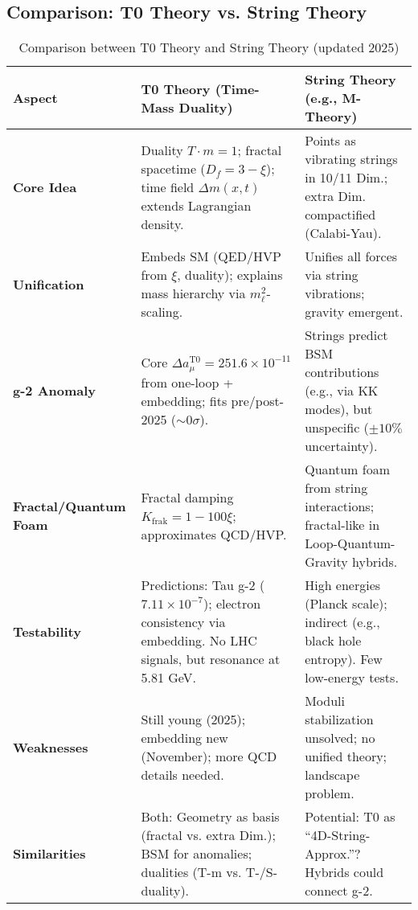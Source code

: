 \documentclass[12pt,a4paper]{article}
\begin{document}
	\subsection{Comparison: T0 Theory vs. String Theory}
	
	\begin{table}[ht]
		\centering
		\begin{tabular}{|p{4cm}|p{5cm}|p{5cm}|}
			\hline
			\textbf{Aspect} & \textbf{T0 Theory (Time-Mass Duality)} & \textbf{String Theory (e.g., M-Theory)} \\
			\hline
			\textbf{Core Idea} & Duality $T \cdot m = 1$; fractal spacetime ($D_f = 3 - \xi$); time field $\Delta m(x,t)$ extends Lagrangian density. & Points as vibrating strings in 10/11 Dim.; extra Dim. compactified (Calabi-Yau). \\
			\hline
			\textbf{Unification} & Embeds SM (QED/HVP from $\xi$, duality); explains mass hierarchy via $m_\ell^2$-scaling. & Unifies all forces via string vibrations; gravity emergent. \\
			\hline
			\textbf{g-2 Anomaly} & Core $\Delta a_\mu^{\text{T0}} = 251.6 \times 10^{-11}$ from one-loop + embedding; fits pre/post-2025 ($\sim 0 \sigma$). & Strings predict BSM contributions (e.g., via KK modes), but unspecific ($\pm 10\%$ uncertainty). \\
			\hline
			\textbf{Fractal/Quantum Foam} & Fractal damping $K_{\text{frak}} = 1 - 100\xi$; approximates QCD/HVP. & Quantum foam from string interactions; fractal-like in Loop-Quantum-Gravity hybrids. \\
			\hline
			\textbf{Testability} & Predictions: Tau g-2 ($7.11 \times 10^{-7}$); electron consistency via embedding. No LHC signals, but resonance at 5.81 GeV. & High energies (Planck scale); indirect (e.g., black hole entropy). Few low-energy tests. \\
			\hline
			\textbf{Weaknesses} & Still young (2025); embedding new (November); more QCD details needed. & Moduli stabilization unsolved; no unified theory; landscape problem. \\
			\hline
			\textbf{Similarities} & Both: Geometry as basis (fractal vs. extra Dim.); BSM for anomalies; dualities (T-m vs. T-/S-duality). & Potential: T0 as ``4D-String-Approx.''? Hybrids could connect g-2. \\
			\hline
		\end{tabular}
		\caption{Comparison between T0 Theory and String Theory (updated 2025)}
		\label{tab:string_comparison}
	\end{table}
	
\end{document}
